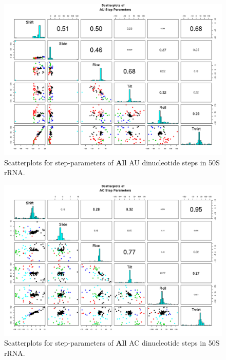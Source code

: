 \begin{figure}[H]
\centering
\includegraphics[angle=90, scale=0.6]{All/AU.png}
\caption{Scatterplots for step-parameters of \textbf{All} AU dinucleotide steps
in 50S rRNA.}
\label{fig:stepsAU}
\end{figure}

\begin{figure}[H]
\centering
\includegraphics[angle=90, scale=0.6]{All/AC.png}
\caption{Scatterplots for step-parameters of \textbf{All} AC dinucleotide steps
in 50S rRNA.}
\label{fig:stepsAC}
\end{figure}

